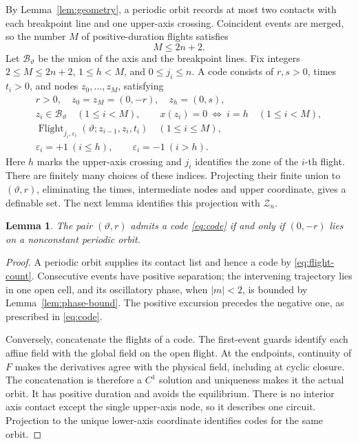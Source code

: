 \documentclass[11pt]{article}
\newtheorem{lemma}[theorem]{Lemma}
\theoremstyle{remark}
\begin{document}
By Lemma~\ref{lem:geometry}, a periodic orbit records at most two contacts
with each breakpoint line and one upper-axis crossing.  Coincident events
are merged, so the number \(M\) of positive-duration flights satisfies
\begin{equation}\label{eq:flight-count}
                              M\le 2n+2.
\end{equation}
Let \(\mathcal B_\vartheta\) be the union of the axis and the breakpoint
lines.  Fix integers \(2\le M\le2n+2\), \(1\le h<M\), and
\(0\le j_i\le n\).  A code consists of \(r,s>0\), times \(t_i>0\), and
nodes \(z_0,\ldots,z_M\), satisfying
\begin{equation}\label{eq:code}
\begin{gathered}
r>0,\quad z_0=z_M=(0,-r),\quad z_h=(0,s),\\
z_i\in\mathcal B_\vartheta\quad(1\le i<M),\qquad
x(z_i)=0\ \Longleftrightarrow\ i=h\quad(1\le i<M),\\
\operatorname{Flight}_{j_i,\varepsilon_i}
       (\vartheta;z_{i-1},z_i,t_i)\quad(1\le i\le M),\\
\varepsilon_i=+1\ (i\le h),\qquad \varepsilon_i=-1\ (i>h).
\end{gathered}
\end{equation}
Here \(h\) marks the upper-axis crossing and \(j_i\) identifies the
zone of the \(i\)-th flight.  There are finitely many choices of these
indices.  Projecting their finite union to \((\vartheta,r)\), eliminating
the times, intermediate nodes and upper coordinate, gives a definable
set.  The next lemma identifies this projection with \(\mathcal Z_n\).

\begin{lemma}\label{lem:equivalence}
The pair \((\vartheta,r)\) admits a code \eqref{eq:code} if and only if
\((0,-r)\) lies on a nonconstant periodic orbit.
\end{lemma}
\begin{proof}
A periodic orbit supplies its contact list and hence a code by
\eqref{eq:flight-count}.  Consecutive events have positive separation;
the intervening trajectory lies in one open cell, and its oscillatory
phase, when \(|m|<2\), is bounded by Lemma~\ref{lem:phase-bound}.  The
positive excursion precedes the negative one, as prescribed in
\eqref{eq:code}.

Conversely, concatenate the flights of a code.  The first-event guards
identify each affine field with the global field on the open flight.
At the endpoints, continuity of \(F\) makes the derivatives agree with
the physical field, including at cyclic closure.  The concatenation is
therefore a \(C^1\) solution and uniqueness makes it the actual orbit.
It has positive duration and avoids the equilibrium.  There is no
interior axis contact except the single upper-axis node, so it describes
one circuit.  Projection to the unique lower-axis coordinate identifies
codes for the same orbit.
\end{proof}
\end{document}

